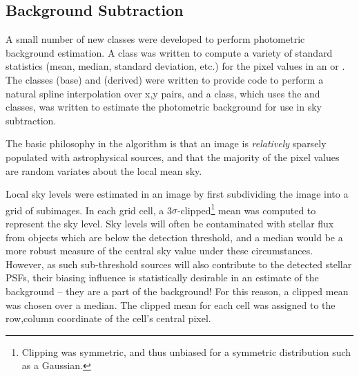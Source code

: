 
\subsection{Background Subtraction}
\label{secBackground}


A small number of new classes were developed to perform photometric
background estimation.  A  class was written to compute a
variety of standard statistics (mean, median, standard deviation,
etc.) for the pixel values in an  or .  The classes
 (base) and  (derived) were written to
provide code to perform a natural spline interpolation over x,y pairs,
and a  class, which uses the  and 
classes, was written to estimate the photometric background for use in
sky subtraction.


The basic philosophy in the algorithm is that an image is {\itshape
relatively} sparsely populated with astrophysical sources, and that the
majority of the pixel values are random variates about the local mean
sky.


Local sky levels were estimated in an image by first subdividing the
image into a grid of subimages.  In each grid cell, a
3$\sigma$-clipped\footnote{Clipping was symmetric, and thus unbiased
for a symmetric distribution such as a Gaussian.} mean was computed to
represent the sky level.  Sky levels will often be contaminated with
stellar flux from objects which are below the detection threshold, and
a median would be a more robust measure of the central sky value under
these circumstances.  However, as such sub-threshold sources will also
contribute to the detected stellar PSFs, their biasing influence is
statistically desirable in an estimate of the background -- they are a
part of the background!  For this reason, a clipped mean was chosen
over a median.  The clipped mean for each cell was assigned to the
row,column coordinate of the cell's central pixel. 


